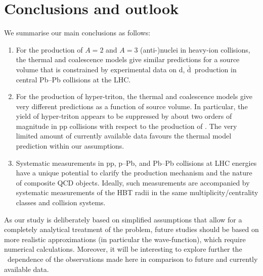 \section{Conclusions and outlook}
We summarise our main conclusions as follows:
\begin{enumerate}
	\item For the production of $A=2$ and $A=3$ (anti-)nuclei in heavy-ion collisions, the thermal and coalescence models give similar predictions for a source volume that is constrained by experimental data on d, $\bar{\mathrm{d}}$~production in central Pb--Pb collisions at the LHC.
	\item For the production of hyper-triton, the thermal and coalescence models give very different predictions as a function of source volume. In particular, the yield of hyper-triton appears to be suppressed by about two orders of magnitude in pp collisions with respect to the production of \hethree. The very limited amount of currently available data favours the thermal model prediction within our assumptions.
	\item Systematic measurements in pp, p--Pb, and Pb--Pb collisions at LHC energies have a unique potential to clarify the production mechanism and the nature of composite QCD objects. Ideally, such measurements are accompanied by systematic measurements of the HBT radii in the same multiplicity/centrality classes and collision systems.
\end{enumerate}

As our study is deliberately based on simplified assumptions that allow for a completely analytical treatment of the problem, future studies should be based on more realistic approximations (in particular the wave-function), which require numerical calculations. Moreover, it will be interesting to explore further the \pt~dependence of the observations made here in comparison to future and currently available data. 

